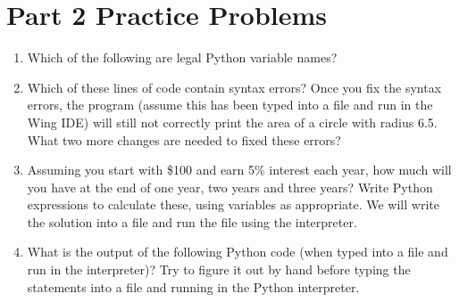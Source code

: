 \documentclass[letterpaper,10pt,english]{sphinxmanual}
\begin{document}
\section{Part 2 Practice Problems}
\label{\detokenize{lecture_notes/lec02_calculator:part-2-practice-problems}}\begin{enumerate}
\item {} 
Which of the following are legal Python variable names?

%
\begin{sphinxVerbatim}[commandchars=\\\{\}]
 
\end{sphinxVerbatim}

\item {} 
Which of these lines of code contain syntax errors? Once you fix
the syntax errors, the program (assume this has been typed into a
file and run in the Wing IDE) will still not correctly print the
area of a circle with radius 6.5.  What two more changes are needed
to fixed these errors?

%
\begin{sphinxVerbatim}[commandchars=\\\{\}]
    
      
  
    
\end{sphinxVerbatim}

\item {} 
Assuming you start with \$100 and earn 5\% interest each year, how
much will you have at the end of one year, two years and three years?
Write Python expressions to calculate these, using variables as
appropriate.  We will write the solution into a file
and run the file using the interpreter.

\item {} 
What is the output of the following Python code (when typed into a
file and run in the interpreter)? Try to figure it out by hand
before typing the statements into a file and running in the Python
interpreter.

%
\begin{sphinxVerbatim}[commandchars=\\\{\}]
  
  
  
 
   
  
    
 
  
 
\end{sphinxVerbatim}


\end{enumerate}
\end{document}
